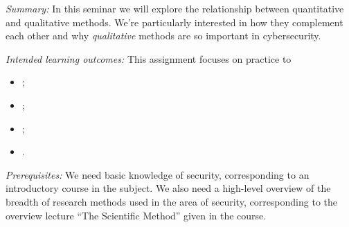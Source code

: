 
\emph{Summary:}
In this seminar we will explore the relationship between quantitative and 
qualitative methods.
We're particularly interested in how they complement each other and why 
\emph{qualitative} methods are so important in cybersecurity.

\emph{Intended learning outcomes:}
This assignment focuses on practice to
\begin{itemize}
  \item \LOrelate;
  \item \LOevaluate;
  \item \LOapply;
  \item \LOcomm.
\end{itemize}

\emph{Prerequisites:}
We need basic knowledge of security, corresponding to an introductory course in 
the subject.
We also need a high-level overview of the breadth of research methods used in 
the area of security, corresponding to the overview lecture \enquote{The 
Scientific Method} given in the course.
